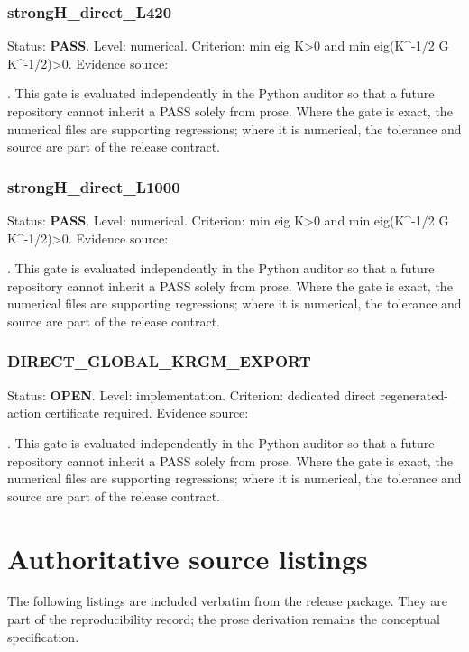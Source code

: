 \documentclass[11pt,a4paper,oneside]{book}
\begin{document}
\subsection{strongH\_direct\_L420}
Status: \textbf{PASS}. Level: numerical. Criterion: min eig K>0 and min eig(K\textasciicircum{}-1/2 G K\textasciicircum{}-1/2)>0. Evidence source:\par\noindent{}. This gate is evaluated independently in the Python auditor so that a future repository cannot inherit a PASS solely from prose. Where the gate is exact, the numerical files are supporting regressions; where it is numerical, the tolerance and source are part of the release contract.\par

\subsection{strongH\_direct\_L1000}
Status: \textbf{PASS}. Level: numerical. Criterion: min eig K>0 and min eig(K\textasciicircum{}-1/2 G K\textasciicircum{}-1/2)>0. Evidence source:\par\noindent{}. This gate is evaluated independently in the Python auditor so that a future repository cannot inherit a PASS solely from prose. Where the gate is exact, the numerical files are supporting regressions; where it is numerical, the tolerance and source are part of the release contract.\par

\subsection{DIRECT\_GLOBAL\_KRGM\_EXPORT}
Status: \textbf{OPEN}. Level: implementation. Criterion: dedicated direct regenerated-action certificate required. Evidence source:\par\noindent{}. This gate is evaluated independently in the Python auditor so that a future repository cannot inherit a PASS solely from prose. Where the gate is exact, the numerical files are supporting regressions; where it is numerical, the tolerance and source are part of the release contract.\par

\chapter{Authoritative source listings}
The following listings are included verbatim from the release package. They are part of the reproducibility record; the prose derivation remains the conceptual specification.
\end{document}
